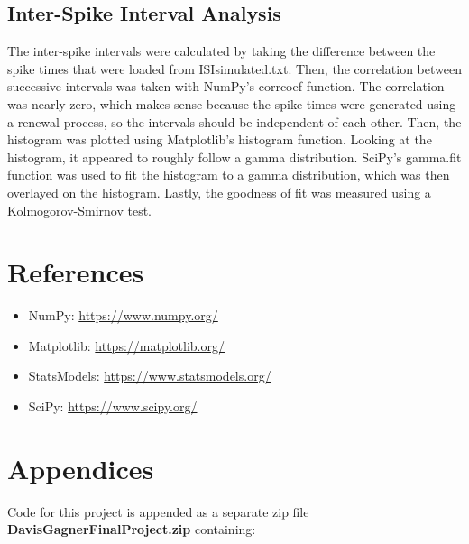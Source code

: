 \documentclass[letterpaper,titlepage,10pt]{article}
\begin{document}
\subsection{Inter-Spike Interval Analysis}

The inter-spike intervals were calculated by taking the difference between the spike times that were loaded from
ISIsimulated.txt. Then, the correlation between successive intervals was taken with NumPy's corrcoef function.
The correlation was nearly zero, which makes sense because the spike times were generated using a renewal process,
so the intervals should be independent of each other. Then, the histogram was plotted using Matplotlib's histogram
function. Looking at the histogram, it appeared to roughly follow a gamma distribution. SciPy's gamma.fit function
was used to fit the histogram to a gamma distribution, which was then overlayed on the histogram. Lastly, the
goodness of fit was measured using a Kolmogorov-Smirnov test.

\section{References}

\begin{itemize}
\item NumPy: \url{https://www.numpy.org/}
\item Matplotlib: \url{https://matplotlib.org/}
\item StatsModels: \url{https://www.statsmodels.org/}
\item SciPy: \url{https://www.scipy.org/}
\end{itemize}

\section{Appendices}

Code for this project is appended as a separate zip file \textbf{DavisGagnerFinalProject.zip} containing:
\end{document}
